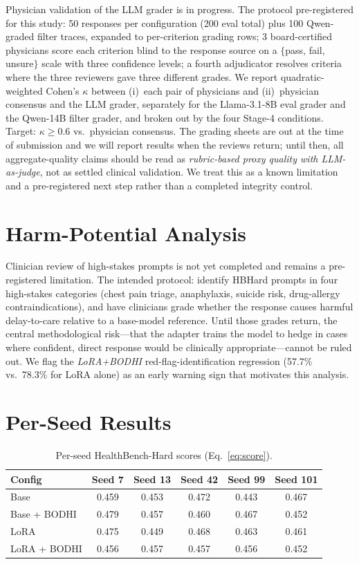 \documentclass{article}
\newcommand{\bodhi}{BODHI}
\newcommand{\hbhard}{HealthBench-Hard}
\begin{document}
Physician validation of the LLM grader is in progress. The protocol pre-registered for this study: 50 responses per configuration (200 eval total) plus 100 Qwen-graded filter traces, expanded to per-criterion grading rows; 3 board-certified physicians score each criterion blind to the response source on a $\{$pass, fail, unsure$\}$ scale with three confidence levels; a fourth adjudicator resolves criteria where the three reviewers gave three different grades. We report quadratic-weighted Cohen's $\kappa$ between (i)~each pair of physicians and (ii)~physician consensus and the LLM grader, separately for the Llama-3.1-8B eval grader and the Qwen-14B filter grader, and broken out by the four Stage-4 conditions. Target: $\kappa \geq 0.6$ vs.\ physician consensus. The grading sheets are out at the time of submission and we will report results when the reviews return; until then, all aggregate-quality claims should be read as \emph{rubric-based proxy quality with LLM-as-judge}, not as settled clinical validation. We treat this as a known limitation and a pre-registered next step rather than a completed integrity control.

\section{Harm-Potential Analysis}
\label{app:harm}

Clinician review of high-stakes prompts is not yet completed and remains a pre-registered limitation. The intended protocol: identify HBHard prompts in four high-stakes categories (chest pain triage, anaphylaxis, suicide risk, drug-allergy contraindications), and have clinicians grade whether the response causes harmful delay-to-care relative to a base-model reference. Until those grades return, the central methodological risk---that the adapter trains the model to hedge in cases where confident, direct response would be clinically appropriate---cannot be ruled out. We flag the \emph{LoRA+\bodhi{}} red-flag-identification regression (57.7\% vs.\ 78.3\% for LoRA alone) as an early warning sign that motivates this analysis.

\section{Per-Seed Results}
\label{app:perseed}

\begin{table}[t]
\centering
\caption{Per-seed \hbhard{} scores (Eq.~\ref{eq:score}).}
\begin{tabular}{lccccc}
\toprule
Config & Seed 7 & Seed 13 & Seed 42 & Seed 99 & Seed 101 \\
\midrule
Base & 0.459 & 0.453 & 0.472 & 0.443 & 0.467 \\
Base + \bodhi{} & 0.479 & 0.457 & 0.460 & 0.467 & 0.452 \\
LoRA & 0.475 & 0.449 & 0.468 & 0.463 & 0.461 \\
LoRA + \bodhi{} & 0.456 & 0.457 & 0.457 & 0.456 & 0.452 \\
\bottomrule
\end{tabular}
\end{table}
\end{document}
